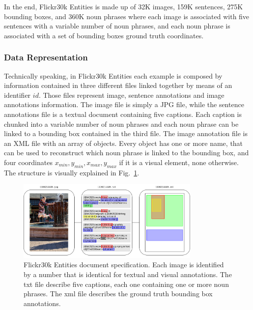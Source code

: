 In the end, Flickr30k Entities is made up of 32K images, 159K
sentences, 275K bounding boxes, and 360K noun phrases where each image
is associated with five sentences with a variable number of noun
phrases, and each noun phrase is associated with a set of bounding
boxes ground truth coordinates. 

\subsubsection{Data Representation}
\label{subsec:flickr30k-data-representation}

Technically speaking, in Flickr30k Entities each example is composed
by information contained in three different files linked together by
means of an identifier $id$. Those files represent image, sentence
annotations and image annotations information. The image file is
simply a JPG file, while the sentence annotations file is a textual
document containing five captions. Each caption is chunked into a
variable number of noun phrases and each noun phrase can be linked to
a bounding box contained in the third file. The image annotation file
is an XML file with an array of objects. Every object has one or more
name, that can be used to reconstruct which noun phrase is linked to
the bounding box, and four coordinates $x_{min}, y_{min}, x_{max},
y_{max}$ if it is a visual element, none otherwise. The structure is
visually explained in
Fig.~\ref{fig:flickr30k-technical-data-representation}.

\begin{figure}
  \centering
  \includegraphics[width=0.8\textwidth]{figures/flickr30k-document-specification.png}
  \caption[Flickr30k Entities document specification]{ Flickr30k
    Entities document specification. Each image is identified by a
    number that is identical for textual and visual annotations. The
    txt file describe five captions, each one containing one or more
    noun phrases. The xml file describes the ground truth bounding box
    annotations. }
  \label{fig:flickr30k-technical-data-representation}
\end{figure}

